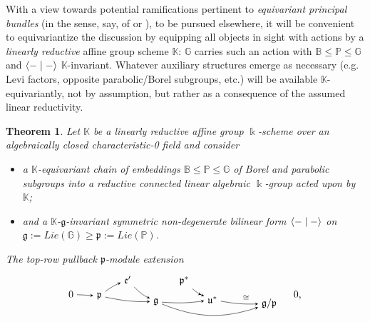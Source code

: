 \documentclass[11pt,leqno]{article}
\theoremstyle{plain}
\newtheorem{theorem}[lemma]{Theorem}
\theoremstyle{plain}
\theoremstyle{plain}
\numberwithin{equation}{section}
\theoremstyle{nonumberplain}
\newcommand\bB{{\mathbb B}}
\newcommand\bG{{\mathbb G}}
\newcommand\bK{{\mathbb K}}
\newcommand\bP{{\mathbb P}}
\newcommand\fe{{\mathfrak e}}
\newcommand\fg{{\mathfrak g}}
\newcommand\fp{{\mathfrak p}}
\newcommand\fu{{\mathfrak u}}
\newcommand\1{{\bf 1}}
\begin{document}
With a view towards potential ramifications pertinent to \emph{equivariant principal bundles} (in the sense, say, of \cite[\S I.8]{td_transf-gp} or \cite[Chapter VII]{may_eq-hotop_1996}), to be pursued elsewhere, it will be convenient to equivariantize the discussion by equipping all objects in sight with actions by a \emph{linearly reductive} \cite[Definition 1.4]{fkm} affine group scheme $\bK$: $\bG$ carries such an action with $\bB\le \bP\le \bG$ and $\Braket{-\mid-}$ $\bK$-invariant. Whatever auxiliary structures emerge as necessary (e.g. Levi factors, opposite parabolic/Borel subgroups, etc.) will be available $\bK$-equivariantly, not by assumption, but rather as a consequence of the assumed linear reductivity. 

\begin{theorem}\label{th:same.poiss}
  Let $\bK$ be a linearly reductive affine group $\Bbbk$-scheme over an algebraically closed characteristic-0 field and consider
  \begin{itemize}[wide]
  \item a $\bK$-equivariant chain of embeddings $\bB\le \bP\le \bG$ of Borel and parabolic subgroups into a reductive connected linear algebraic $\Bbbk$-group acted upon by $\bK$;
  \item and a $\bK$-$\fg$-invariant symmetric non-degenerate bilinear form $\Braket{-\mid -}$ on $\fg:=Lie(\bG)\ge \fp:=Lie(\bP)$. 
  \end{itemize}
  The top-row pullback $\fp$-module extension
  \begin{equation}\label{eq:plbk.ext}
    \begin{tikzpicture}[>=stealth,auto,baseline=(current  bounding  box.center)]
      \path[anchor=base] 
      (0,0) node (0l) {$0$}
      +(8,0) node (0r) {$0$,}
      +(1,0) node (p) {$\fp$}
      +(3,-.2) node (g) {$\fg$}
      +(5,-.2) node (uast) {$\fu^*$}
      +(7,-.3) node (gp) {$\fg/\fp$}
      +(2,.5) node (e) {$\fe'$}
      +(4,.5) node (past) {$\fp^*$}
      ;
      \draw[->] (0l) to[bend left=0] node[pos=.5,auto] {$\scriptstyle $} (p);
      \draw[->] (p) to[bend right=6] node[pos=.5,auto] {$\scriptstyle $} (g);
      \draw[->] (g) to[bend right=6] node[pos=.5,auto,swap] {$\scriptstyle $} (uast);
      \draw[->] (uast) to[bend right=6] node[pos=.5,auto] {$\scriptstyle \cong$} (gp);
      \draw[->] (g) to[bend right=20] node[pos=.5,auto,swap] {$\scriptstyle $} (gp);
      \draw[->] (p) to[bend left=6] node[pos=.5,auto] {$\scriptstyle $} (e);
      \draw[->] (e) to[bend right=10] node[pos=.5,auto] {$\scriptstyle $} (g);
      \draw[->>] (past) to[bend right=10] node[pos=.5,auto] {$\scriptstyle $} (uast);

\end{tikzpicture}
\end{equation}
\end{theorem}
\end{document}
